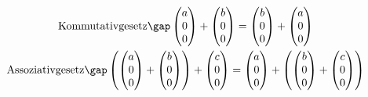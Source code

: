 \begin{gather*}
  \text{Kommutativgesetz}\gap \begin{pmatrix}a \\ 0 \\ 0\end{pmatrix} + \begin{pmatrix}b \\ 0 \\ 0\end{pmatrix} = \begin{pmatrix}b \\ 0 \\ 0\end{pmatrix} + \begin{pmatrix}a \\ 0 \\ 0\end{pmatrix} \\
  \text{Assoziativgesetz}\gap \left(\begin{pmatrix}a \\ 0 \\ 0\end{pmatrix} + \begin{pmatrix}b \\ 0 \\ 0\end{pmatrix}\right) + \begin{pmatrix}c \\ 0 \\ 0\end{pmatrix} = \begin{pmatrix}a \\ 0 \\ 0\end{pmatrix} + \left(\begin{pmatrix}b \\ 0 \\ 0\end{pmatrix} + \begin{pmatrix}c \\ 0 \\ 0\end{pmatrix}\right)
\end{gather*}
